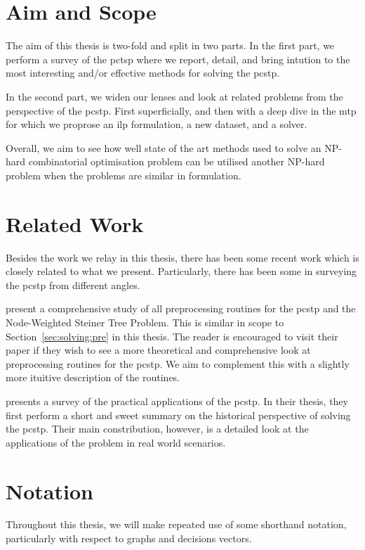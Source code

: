 \section{Aim and Scope}
The aim of this thesis is two-fold and split in two parts. In the first part, we perform a
survey of the \acrlong{pctsp} where we report, detail, and bring intution to the most interesting
and/or effective methods for solving the \gls{pcstp}.

In the second part, we widen our lenses and look at related problems from the perspective of
the \gls{pcstp}. First superficially, and then with a deep dive in the \acrlong{mtp} for which
we proprose an \gls{ilp} formulation, a new dataset, and a solver.

Overall, we aim to see how well state of the art methods used to solve an NP-hard combinatorial
optimisation problem can be utilised another NP-hard problem when the problems are similar in
formulation.

\section{Related Work}
Besides the work we relay in this thesis, there has been some recent work which is closely related
 to what we present. Particularly, there has been some in surveying the
\acrlong{pcstp} from different angles.

\citet*{rehfeldt2016reduction} present a comprehensive study of all preprocessing routines
for the \gls{pcstp} and the Node-Weighted Steiner Tree Problem. This is similar in scope to
Section~\ref{sec:solving:pre} in this thesis. The reader is encouraged to visit their paper
if they wish to see a more theoretical and comprehensive look at preprocessing routines for
the \gls{pcstp}. We aim to complement this with a slightly more ituitive description of the
routines.

\citet*{sun2018classical} presents a survey of the practical applications of the \gls{pcstp}.
In their thesis, they first perform a short and sweet summary on the historical perspective of
solving the \gls{pcstp}. Their main constribution, however,
is a detailed look at the applications
of the problem in real world scenarios.


\section{Notation}
\label{sec:intro:notation}

Throughout this thesis, we will make repeated use of some shorthand notation, particularly
with respect to graphs and decisions vectors.

